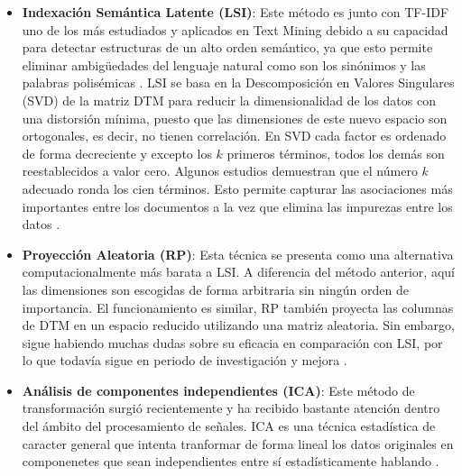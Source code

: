 \documentclass[10pt, a4paper]{article}
\begin{document}
\begin{itemize}
  \item \textbf{Indexación Semántica Latente (LSI)}: Este método es junto con TF-IDF uno de los más estudiados y aplicados en Text Mining debido a su capacidad para detectar estructuras de un alto orden semántico, ya que esto permite eliminar ambigüedades del lenguaje natural como son los sinónimos y las palabras polisémicas \cite{Comparing and Combining Dimension Reduction Techniques for Efficient Text}. LSI se basa en la Descomposición en Valores Singulares (SVD) de la matriz DTM para reducir la dimensionalidad de los datos con una distorsión mínima, puesto que las dimensiones de este nuevo espacio son ortogonales, es decir, no tienen correlación. En SVD cada factor es ordenado de forma decreciente y excepto los $k$ primeros términos, todos los demás son reestablecidos a valor cero. Algunos estudios demuestran que el número $k$ adecuado ronda los cien términos. Esto permite capturar las asociaciones más importantes entre los documentos a la vez que elimina las impurezas entre los datos \cite{survey text, A comparative study of tf idf lsi and multi words for text classification}.
  
  \item \textbf{Proyección Aleatoria (RP)}: Esta técnica se presenta como una alternativa computacionalmente más barata a LSI. A diferencia del método anterior, aquí las dimensiones son escogidas de forma arbitraria sin ningún orden de importancia. El funcionamiento es similar, RP también proyecta las columnas de DTM en un espacio reducido utilizando una matriz aleatoria. Sin embargo, sigue habiendo muchas dudas sobre su eficacia en comparación con LSI, por lo que todavía sigue en periodo de investigación y mejora \cite{Comparing and Combining Dimension Reduction Techniques for Efficient Text}.
  
  \item \textbf{Análisis de componentes independientes (ICA)}: Este método de transformación surgió recientemente y ha recibido bastante atención dentro del ámbito del procesamiento de señales. ICA es una técnica estadística de caracter general que intenta tranformar de forma lineal los datos originales en componenetes que sean independientes entre sí estadísticamente hablando \cite{Comparing and Combining Dimension Reduction Techniques for Efficient Text}. 
\end{itemize}

\end{document}
